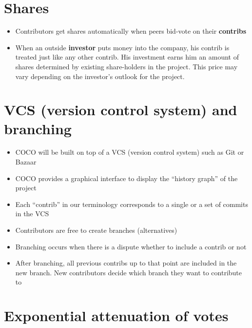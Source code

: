 \documentclass[12pt, orivec, fleqn]{article}
\begin{document}
\secttoc
\section{Shares}

\begin{itemize}
	\item Contributors get shares automatically when peers bid-vote on their \textbf{contribs}
	
	\item When an outside \textbf{investor} puts money into the company, his contrib is treated just like any other contrib.  His investment earns him an amount of shares determined by existing share-holders in the project.  This price may vary depending on the investor's outlook for the project.	
\end{itemize}

\secttoc
\section{VCS (version control system) and branching}

\begin{itemize}
	\item COCO will be built on top of a VCS (version control system) such as Git or Bazaar
	
	\item COCO provides a graphical interface to display the ``history graph'' of the project
	
	\item Each ``contrib'' in our terminology corresponds to a single or a set of commits in the VCS
	
	\item Contributors are free to create branches (alternatives)

	\item Branching occurs when there is a dispute whether to include a contrib or not

	\item After branching, all previous contribs up to that point are included in the new branch.  New contributors decide which branch they want to contribute to
\end{itemize}

\secttoc
\section{Exponential attenuation of votes}
\end{document}
